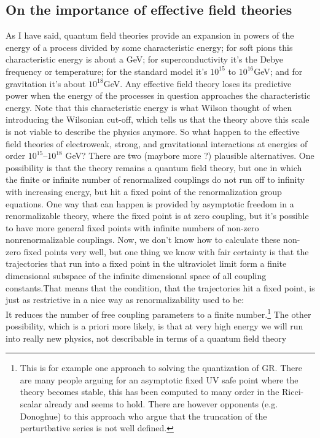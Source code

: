 \subsection{On the importance of effective field theories}
As I have said, quantum field theories provide an expansion in
powers of the energy of a process divided by some characteristic
energy; for soft pions this characteristic energy is about a GeV;
for superconductivity it’s the Debye frequency or temperature;
for the standard model it’s $10^{15}$ to $10^{ 16}$GeV; and for gravitation it’s about $10^{ 18}$GeV. Any effective field theory loses its predictive power when the energy of the processes in question approaches the characteristic energy. Note that this characteristic energy is what Wilson thought of when introducing the Wilsonian cut-off, which tells us that the theory above this scale is not viable to describe the physics anymore. So what happen to the effective field theories of electroweak, strong, and gravitational interactions at energies of order $10^{ 15} – 10^{ 18}$ GeV? There are two (maybore more ?) plausible alternatives. One possibility is that the theory remains a quantum field theory, but one in which the finite or infinite number of renormalized couplings do not run off to infinity with increasing energy, but hit a fixed point of the renormalization group equations. One way that can happen is provided
by asymptotic freedom in a renormalizable theory, where
the fixed point is at zero coupling, but it’s possible to have more
general fixed points with infinite numbers of non-zero nonrenormalizable couplings. Now, we don’t know how to calculate these
non-zero fixed points very well, but one thing we know with fair
certainty is that the trajectories that run into a fixed point in the
ultraviolet limit form a finite dimensional subspace of the infinite dimensional space of all coupling constants.That means that
the condition, that the trajectories hit a fixed point, is just as restrictive in a nice way as renormalizability used to be: \\
It reduces
the number of free coupling parameters to a finite number.\footnote{This is for example one approach to solving the quantization of GR. There are many people arguing for an asymptotic fixed UV safe point where the theory becomes stable, this has been computed to many order in the Ricci-scalar already and seems to hold. There are however opponents (e.g. Donoghue) to this approach who argue that the truncation of the perturtbative series is not well defined.}
 The
other possibility, which is a priori more likely, is
that at very high energy we will run into really new physics, not
describable in terms of a quantum field theory


